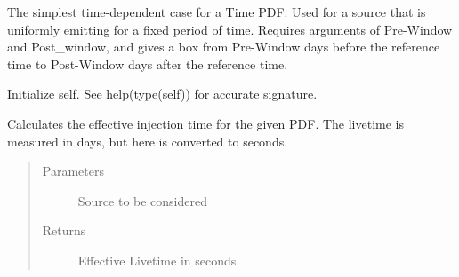 \documentclass[letterpaper,10pt,english]{sphinxmanual}
\begin{document}
\begin{fulllineitems}
\label{\detokenize{index:flarestack.core.time_pdf.Box}}
The simplest time-dependent case for a Time PDF. Used for a source that
is uniformly emitting for a fixed period of time. Requires arguments of
Pre-Window and Post\_window, and gives a box from Pre-Window days before
the reference time to Post-Window days after the reference time.

\begin{fulllineitems}
\label{\detokenize{index:flarestack.core.time_pdf.Box.__init__}}
Initialize self.  See help(type(self)) for accurate signature.

\end{fulllineitems}


\begin{fulllineitems}
\label{\detokenize{index:flarestack.core.time_pdf.Box.effective_injection_time}}
Calculates the effective injection time for the given PDF.
The livetime is measured in days, but here is converted to seconds.
\begin{quote}\begin{description}
\item[{Parameters}] \leavevmode
{} \textendash{} Source to be considered

\item[{Returns}] \leavevmode
Effective Livetime in seconds

\end{description}\end{quote}

\end{fulllineitems}



\end{fulllineitems}
\end{document}
